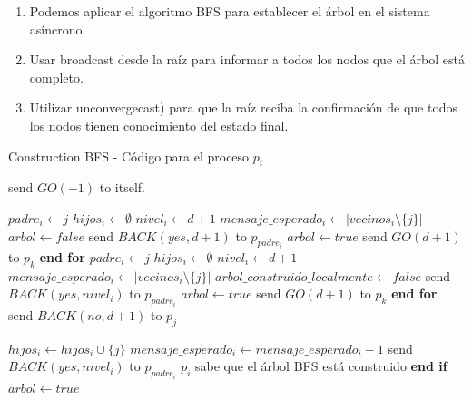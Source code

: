 \documentclass[12pt]{article}
\begin{document}
\begin{enumerate}
    \item Podemos aplicar el algoritmo BFS para establecer el \'arbol en el sistema as\'incrono.
    \item Usar broadcast desde la ra\'iz para informar a todos los nodos que el \'arbol est\'a completo.
    \item Utilizar unconvergecast) para que la ra\'iz reciba la confirmaci\'on de que todos los nodos tienen conocimiento del estado final.
\end{enumerate}
\newpage
\begin{algorithm}[H]
\caption{Construction BFS - Código para el proceso $p_i$}
\begin{algorithmic}[1]
  
    \State send $GO(-1)$ to itself.

        \State $padre_i \gets j$
        \State $hijos_i \gets \emptyset$
        \State $nivel_i \gets d+1$
        \State $mensaje\_esperado_i \gets |vecinos_i \setminus \{j\}|$
        \State $arbol \gets false$
            \State send $BACK(yes,d+1)$ to $p_{padre_i}$
            \State $arbol \gets true$
        \Else
                \State send $GO(d+1)$ to $p_k$
            \State \textbf{end for}
        \EndIf
        \State $padre_i \gets j$
        \State $hijos_i \gets \emptyset$
        \State $nivel_i \gets d+1$
        \State $mensaje\_esperado_i \gets |vecinos_i \setminus \{j\}|$
        \State $arbol\_construido\_localmente \gets false$
            \State send $BACK(yes,nivel_i)$ to $p_{padre_i}$
            \State $arbol \gets true$
        \Else
                \State send $GO(d+1)$ to $p_k$
            \State \textbf{end for}
        \EndIf
    \Else
        \State send $BACK(no,d+1)$ to $p_j$
    \EndIf
\EndWhen

            \State $hijos_i \gets hijos_i \cup \{j\}$
        \EndIf
        \State $mensaje\_esperado_i \gets mensaje\_esperado_i - 1$
                \State send $BACK(yes,nivel_i)$ to $p_{padre_i}$
            \Else
                \State $p_i$ sabe que el árbol BFS está construido
            \State \textbf{end if}
            \State $arbol \gets true$
        \EndIf
    \EndIf
\EndWhen
\end{algorithmic}
\end{algorithm}
\end{document}
